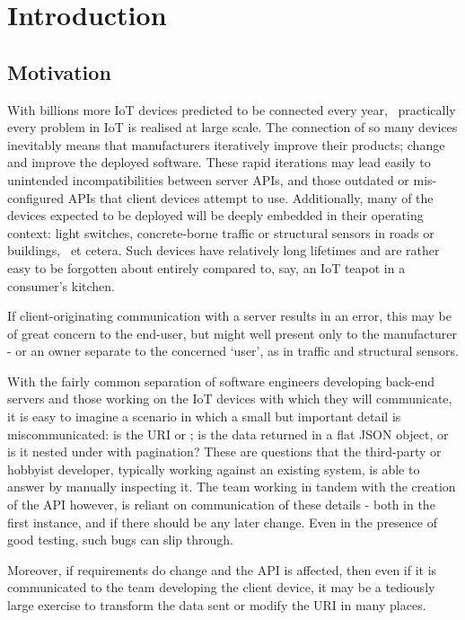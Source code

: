 \section{Introduction}\label{intro}
\subsection{Motivation}\label{intro:motivation}

With billions more IoT devices predicted to be connected every year,~\cite{gartner_billions_iot} practically every problem in IoT is realised at large scale. The connection of so many devices inevitably means that manufacturers iteratively improve their products; change and improve the deployed software. These rapid iterations may lead easily to unintended incompatibilities between server APIs, and those outdated or mis-configured APIs that client devices attempt to use. Additionally, many of the devices expected to be deployed will be deeply embedded in their operating context: light switches, concrete-borne traffic or structural sensors in roads or buildings,~\cite{construction_and_iot, smart_concrete} et cetera. Such devices have relatively long lifetimes and are rather easy to be forgotten about entirely compared to, say, an IoT teapot in a consumer's kitchen.

If client-originating communication with a server results in an error, this may be of great concern to the end-user, but might well present only to the manufacturer - or an owner separate to the concerned `user', as in traffic and structural sensors.

With the fairly common separation of software engineers developing back-end servers and those working on the IoT devices with which they will communicate, it is easy to imagine a scenario in which a small but important detail is miscommunicated: is the URI  or ; is the data returned in a flat JSON object, or is it nested under  with pagination? These are questions that the third-party or hobbyist developer, typically working against an existing system, is able to answer by manually inspecting it. The team working in tandem with the creation of the API however, is reliant on communication of these details - both in the first instance, and if there should be any later change. Even in the presence of good testing, such bugs can slip through.

Moreover, if requirements do change and the API is affected, then even if it is communicated to the team developing the client device, it may be a tediously large exercise to transform the data sent or modify the URI in many places.

